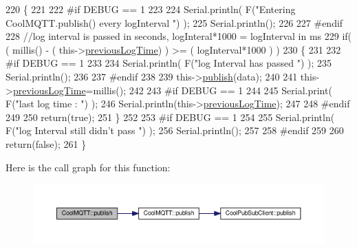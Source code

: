 \begin{DoxyCode}
220 \{
221 
222 \textcolor{preprocessor}{#if DEBUG == 1 }
223 
224     Serial.println( F(\textcolor{stringliteral}{"Entering CoolMQTT.publish() every logInterval "}) );
225     Serial.println();
226 
227 \textcolor{preprocessor}{#endif }
228     \textcolor{comment}{//log interval is passed in seconds, logInteral*1000 = logInterval in ms}
229     \textcolor{keywordflow}{if}( ( millis() - ( this->\hyperlink{class_cool_m_q_t_t_a3db37ef9ed3b05b2a8d44edba0e7d3cc}{previousLogTime})  ) >= ( logInterval*1000 ) )
230     \{
231     
232 \textcolor{preprocessor}{    #if DEBUG == 1}
233 
234         Serial.println( F(\textcolor{stringliteral}{"log Interval has passed "}) );
235         Serial.println();
236     
237 \textcolor{preprocessor}{    #endif}
238 
239         this->\hyperlink{class_cool_m_q_t_t_ace977b3e90ab14b1199fe5c4fb0a13ec}{publish}(data);
240 
241         this->\hyperlink{class_cool_m_q_t_t_a3db37ef9ed3b05b2a8d44edba0e7d3cc}{previousLogTime}=millis();
242     
243 \textcolor{preprocessor}{    #if DEBUG == 1 }
244 
245         Serial.print( F(\textcolor{stringliteral}{"last log time : "}) );
246         Serial.println(this->\hyperlink{class_cool_m_q_t_t_a3db37ef9ed3b05b2a8d44edba0e7d3cc}{previousLogTime});
247 
248 \textcolor{preprocessor}{    #endif}
249 
250         \textcolor{keywordflow}{return}(\textcolor{keyword}{true});
251     \}
252 
253 \textcolor{preprocessor}{#if DEBUG == 1 }
254 
255     Serial.println( F(\textcolor{stringliteral}{"log Interval still didn't pass "}) ); 
256     Serial.println();
257 
258 \textcolor{preprocessor}{#endif}
259 
260     \textcolor{keywordflow}{return}(\textcolor{keyword}{false});
261 \}
\end{DoxyCode}
Here is the call graph for this function\+:\nopagebreak
\begin{figure}[H]
\begin{center}
\leavevmode
\includegraphics[width=350pt]{d0/dd0/class_cool_m_q_t_t_a613c5e3927ae85bb94fbf648d84d8780_cgraph}
\end{center}
\end{figure}
\mbox{\label{class_cool_m_q_t_t_ae3c18f6ae9723746d32765f1c8f176ca}} 
